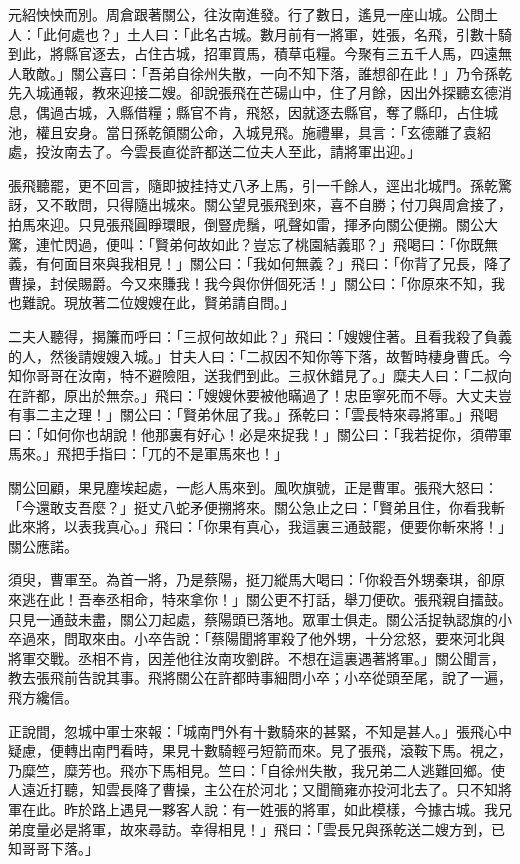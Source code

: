 元紹怏怏而別。周倉跟著關公，往汝南進發。行了數日，遙見一座山城。公問土人：「此何處也？」土人曰：「此名古城。數月前有一將軍，姓張，名飛，引數十騎到此，將縣官逐去，占住古城，招軍買馬，積草屯糧。今聚有三五千人馬，四遠無人敢敵。」關公喜曰：「吾弟自徐州失散，一向不知下落，誰想卻在此！」乃令孫乾先入城通報，教來迎接二嫂。卻說張飛在芒碭山中，住了月餘，因出外探聽玄德消息，偶過古城，入縣借糧；縣官不肯，飛怒，因就逐去縣官，奪了縣印，占住城池，權且安身。當日孫乾領關公命，入城見飛。施禮畢，具言：「玄德離了袁紹處，投汝南去了。今雲長直從許都送二位夫人至此，請將軍出迎。」

張飛聽罷，更不回言，隨即披挂持丈八矛上馬，引一千餘人，逕出北城門。孫乾驚訝，又不敢問，只得隨出城來。關公望見張飛到來，喜不自勝；付刀與周倉接了，拍馬來迎。只見張飛圓睜環眼，倒豎虎鬚，吼聲如雷，揮矛向關公便搠。關公大驚，連忙閃過，便叫：「賢弟何故如此？豈忘了桃園結義耶？」飛喝曰：「你既無義，有何面目來與我相見！」關公曰：「我如何無義？」飛曰：「你背了兄長，降了曹操，封侯賜爵。今又來賺我！我今與你併個死活！」關公曰：「你原來不知，我也難說。現放著二位嫂嫂在此，賢弟請自問。」

二夫人聽得，揭簾而呼曰：「三叔何故如此？」飛曰：「嫂嫂住著。且看我殺了負義的人，然後請嫂嫂入城。」甘夫人曰：「二叔因不知你等下落，故暫時棲身曹氏。今知你哥哥在汝南，特不避險阻，送我們到此。三叔休錯見了。」糜夫人曰：「二叔向在許都，原出於無奈。」飛曰：「嫂嫂休要被他瞞過了！忠臣寧死而不辱。大丈夫豈有事二主之理！」關公曰：「賢弟休屈了我。」孫乾曰：「雲長特來尋將軍。」飛喝曰：「如何你也胡說！他那裏有好心！必是來捉我！」關公曰：「我若捉你，須帶軍馬來。」飛把手指曰：「兀的不是軍馬來也！」

關公回顧，果見塵埃起處，一彪人馬來到。風吹旗號，正是曹軍。張飛大怒曰：「今還敢支吾麼？」挺丈八蛇矛便搠將來。關公急止之曰：「賢弟且住，你看我斬此來將，以表我真心。」飛曰：「你果有真心，我這裏三通鼓罷，便要你斬來將！」關公應諾。

須臾，曹軍至。為首一將，乃是蔡陽，挺刀縱馬大喝曰：「你殺吾外甥秦琪，卻原來逃在此！吾奉丞相命，特來拿你！」關公更不打話，舉刀便砍。張飛親自擂鼓。只見一通鼓未盡，關公刀起處，蔡陽頭已落地。眾軍士俱走。關公活捉執認旗的小卒過來，問取來由。小卒告說：「蔡陽聞將軍殺了他外甥，十分忿怒，要來河北與將軍交戰。丞相不肯，因差他往汝南攻劉辟。不想在這裏遇著將軍。」關公聞言，教去張飛前告說其事。飛將關公在許都時事細問小卒；小卒從頭至尾，說了一遍，飛方纔信。

正說間，忽城中軍士來報：「城南門外有十數騎來的甚緊，不知是甚人。」張飛心中疑慮，便轉出南門看時，果見十數騎輕弓短箭而來。見了張飛，滾鞍下馬。視之，乃糜竺，糜芳也。飛亦下馬相見。竺曰：「自徐州失散，我兄弟二人逃難回鄉。使人遠近打聽，知雲長降了曹操，主公在於河北；又聞簡雍亦投河北去了。只不知將軍在此。昨於路上遇見一夥客人說：有一姓張的將軍，如此模樣，今據古城。我兄弟度量必是將軍，故來尋訪。幸得相見！」飛曰：「雲長兄與孫乾送二嫂方到，已知哥哥下落。」

